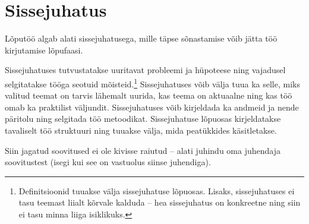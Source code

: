 \section*{Sissejuhatus}

Lõputöö algab alati sissejuhatusega, mille täpse sõnastamise võib jätta töö kirjutamise lõpufaasi.

Sissejuhatuses tutvustatakse uuritavat probleemi ja hüpoteese ning vajadusel selgitatakse tööga seotuid mõisteid.\footnote{Definitsioonid tuuakse välja sissejuhatuse lõpuosas. Lisaks, sissejuhatuses ei tasu teemast liialt kõrvale kalduda -- hea sissejuhatus on konkreetne ning siin ei tasu minna liiga isiklikuks.}
Sissejuhatuses võib välja tuua ka selle, miks valitud teemat on tarvis lähemalt uurida, kas teema on aktuaalne ning kas töö omab ka praktilist väljundit.
Sissejuhatuses võib kirjeldada ka andmeid ja nende päritolu ning selgitada töö metoodikat.
Sissejuhatuse lõpuosas kirjeldatakse tavaliselt töö struktuuri ning tuuakse välja, mida peatükkides käsitletakse.

Siin jagatud soovitused ei ole kivisse raiutud -- alati juhindu oma juhendaja soovitustest (isegi kui see on vastuolus siinse juhendiga).